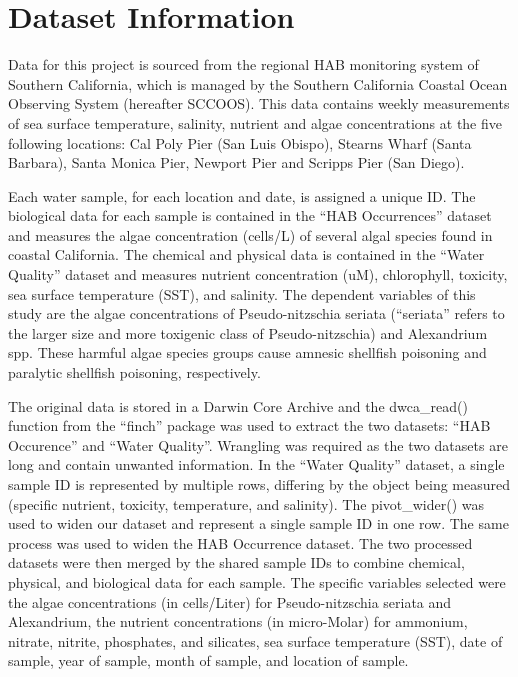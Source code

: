 \documentclass[
  12pt,
]{article}
\begin{document}
\hypertarget{dataset-information}{%
\section{Dataset Information}\label{dataset-information}}

Data for this project is sourced from the regional HAB monitoring system
of Southern California, which is managed by the Southern California
Coastal Ocean Observing System (hereafter SCCOOS). This data contains
weekly measurements of sea surface temperature, salinity, nutrient and
algae concentrations at the five following locations: Cal Poly Pier (San
Luis Obispo), Stearns Wharf (Santa Barbara), Santa Monica Pier, Newport
Pier and Scripps Pier (San Diego).

Each water sample, for each location and date, is assigned a unique ID.
The biological data for each sample is contained in the ``HAB
Occurrences'' dataset and measures the algae concentration (cells/L) of
several algal species found in coastal California. The chemical and
physical data is contained in the ``Water Quality'' dataset and measures
nutrient concentration (uM), chlorophyll, toxicity, sea surface
temperature (SST), and salinity. The dependent variables of this study
are the algae concentrations of Pseudo-nitzschia seriata (``seriata''
refers to the larger size and more toxigenic class of Pseudo-nitzschia)
and Alexandrium spp. These harmful algae species groups cause amnesic
shellfish poisoning and paralytic shellfish poisoning, respectively.

The original data is stored in a Darwin Core Archive and the
dwca\_read() function from the ``finch'' package was used to extract the
two datasets: ``HAB Occurence'' and ``Water Quality''. Wrangling was
required as the two datasets are long and contain unwanted information.
In the ``Water Quality'' dataset, a single sample ID is represented by
multiple rows, differing by the object being measured (specific
nutrient, toxicity, temperature, and salinity). The pivot\_wider() was
used to widen our dataset and represent a single sample ID in one row.
The same process was used to widen the HAB Occurrence dataset. The two
processed datasets were then merged by the shared sample IDs to combine
chemical, physical, and biological data for each sample. The specific
variables selected were the algae concentrations (in cells/Liter) for
Pseudo-nitzschia seriata and Alexandrium, the nutrient concentrations
(in micro-Molar) for ammonium, nitrate, nitrite, phosphates, and
silicates, sea surface temperature (SST), date of sample, year of
sample, month of sample, and location of sample.
\end{document}
